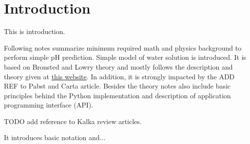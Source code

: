 \section{Introduction}

This is introduction.

Following notes summarize minimum required math and physics background to perform simple pH prediction.
Simple model of water solution is introduced. It is based on Bronsted and Lowry theory and mostly follows the description and theory given at \href{https://www.aqion.de/site/100}{this website}. In addition, it is strongly impacted by the ADD REF to Pabst and Carta article. Besides the theory notes also include basic principles behind the Python implementation and description of application programming interface (API).

TODO add reference to Kalka review articles.

It introduces basic notation and...
